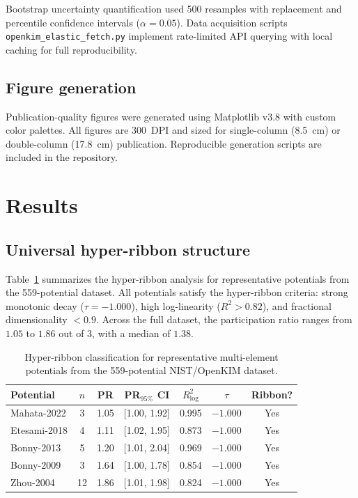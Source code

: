 \documentclass[twocolumn,9pt]{extarticle}
\begin{document}
Bootstrap uncertainty quantification used 500 resamples with replacement and percentile confidence intervals ($\alpha = 0.05$). Data acquisition scripts \texttt{openkim\_elastic\_fetch.py} implement rate-limited API querying with local caching for full reproducibility.

\subsection{Figure generation}

Publication-quality figures were generated using Matplotlib v3.8 with custom color palettes. All figures are 300~DPI and sized for single-column (8.5~cm) or double-column (17.8~cm) publication. Reproducible generation scripts are included in the repository.

\section{Results}

\subsection{Universal hyper-ribbon structure}

Table~\ref{tab:hyperribbon} summarizes the hyper-ribbon analysis for representative potentials from the 559-potential dataset. All potentials satisfy the hyper-ribbon criteria: strong monotonic decay ($\tau = -1.000$), high log-linearity ($R^2 > 0.82$), and fractional dimensionality $< 0.9$. Across the full dataset, the participation ratio ranges from $1.05$ to $1.86$ out of $3$, with a median of $1.38$.

\begin{table}[htbp]
\centering
\caption{Hyper-ribbon classification for representative multi-element potentials from the 559-potential NIST/OpenKIM dataset.}
\label{tab:hyperribbon}
\begin{tabular}{@{}lcccccc@{}}
\toprule
Potential & $n$ & PR & PR$_{95\%}$ CI & $R^2_\text{log}$ & $\tau$ & Ribbon? \\
\midrule
Mahata-2022    & 3  & 1.05 & [1.00, 1.92] & 0.995 & $-1.000$ & Yes \\
Etesami-2018   & 4  & 1.11 & [1.02, 1.95] & 0.873 & $-1.000$ & Yes \\
Bonny-2013     & 5  & 1.20 & [1.01, 2.04] & 0.969 & $-1.000$ & Yes \\
Bonny-2009     & 3  & 1.64 & [1.00, 1.78] & 0.854 & $-1.000$ & Yes \\
Zhou-2004      & 12 & 1.86 & [1.01, 1.98] & 0.824 & $-1.000$ & Yes \\
\bottomrule
\end{tabular}
\end{table}
\end{document}

